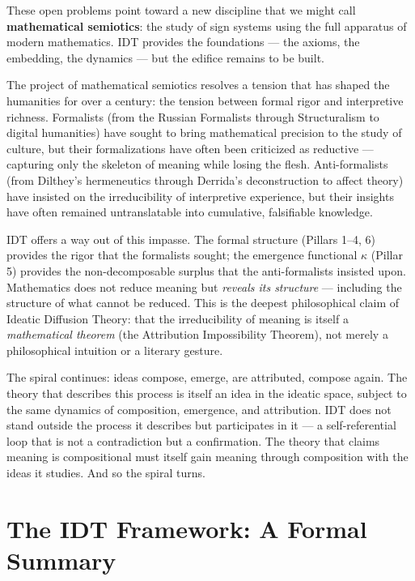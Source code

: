 \begin{interpretation}
\label{interp:ch22:mathematical_semiotics}
These open problems point toward a new discipline that we might call
\textbf{mathematical semiotics}: the study of sign systems using the
full apparatus of modern mathematics.  IDT provides the foundations ---
the axioms, the embedding, the dynamics --- but the edifice remains to
be built.

The project of mathematical semiotics resolves a tension that has
shaped the humanities for over a century: the tension between formal
rigor and interpretive richness.  Formalists (from the Russian Formalists
through Structuralism to digital humanities) have sought to bring
mathematical precision to the study of culture, but their formalizations
have often been criticized as reductive --- capturing only the skeleton
of meaning while losing the flesh.  Anti-formalists (from Dilthey's
hermeneutics through Derrida's deconstruction to affect theory) have
insisted on the irreducibility of interpretive experience, but their
insights have often remained untranslatable into cumulative, falsifiable
knowledge.

IDT offers a way out of this impasse.  The formal structure (Pillars 1--4,
6) provides the rigor that the formalists sought; the emergence functional
$\kappa$ (Pillar 5) provides the non-decomposable surplus that the
anti-formalists insisted upon.  Mathematics does not reduce meaning but
\emph{reveals its structure} --- including the structure of what
cannot be reduced.  This is the deepest philosophical claim of Ideatic
Diffusion Theory: that the irreducibility of meaning is itself a
\emph{mathematical theorem} (the Attribution Impossibility Theorem),
not merely a philosophical intuition or a literary gesture.

The spiral continues: ideas compose, emerge, are attributed, compose
again.  The theory that describes this process is itself an idea in the
ideatic space, subject to the same dynamics of composition, emergence,
and attribution.  IDT does not stand outside the process it describes
but participates in it --- a self-referential loop that is not a
contradiction but a confirmation.  The theory that claims meaning is
compositional must itself gain meaning through composition with the
ideas it studies.  And so the spiral turns.
\end{interpretation}

\section{The IDT Framework: A Formal Summary}

